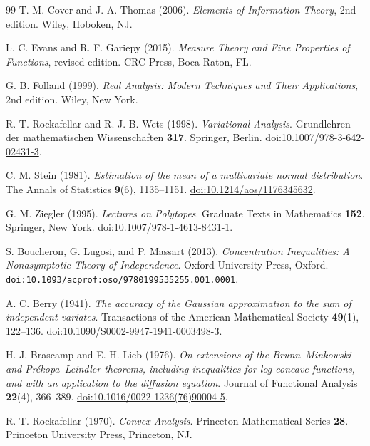 \documentclass[11pt,letterpaper]{article}
\theoremstyle{remark}
\begin{document}
\begin{thebibliography}{99}
T. M. Cover and J. A. Thomas (2006).
\emph{Elements of Information Theory}, 2nd edition.
Wiley, Hoboken, NJ.

L. C. Evans and R. F. Gariepy (2015).
\emph{Measure Theory and Fine Properties of Functions}, revised edition.
CRC Press, Boca Raton, FL.

G. B. Folland (1999).
\emph{Real Analysis: Modern Techniques and Their Applications}, 2nd edition.
Wiley, New York.

R. T. Rockafellar and R. J.-B. Wets (1998).
\emph{Variational Analysis}.
Grundlehren der mathematischen Wissenschaften \textbf{317}.
Springer, Berlin.
\href{https://doi.org/10.1007/978-3-642-02431-3}{doi:10.1007/978-3-642-02431-3}.

C. M. Stein (1981).
\emph{Estimation of the mean of a multivariate normal distribution}.
The Annals of Statistics \textbf{9}(6), 1135--1151.
\href{https://doi.org/10.1214/aos/1176345632}{doi:10.1214/aos/1176345632}.

G. M. Ziegler (1995).
\emph{Lectures on Polytopes}.
Graduate Texts in Mathematics \textbf{152}. Springer, New York.
\href{https://doi.org/10.1007/978-1-4613-8431-1}{doi:10.1007/978-1-4613-8431-1}.

S. Boucheron, G. Lugosi, and P. Massart (2013).
\emph{Concentration Inequalities: A Nonasymptotic Theory of Independence}.
Oxford University Press, Oxford.
\href{https://doi.org/10.1093/acprof:oso/9780199535255.001.0001}{\nolinkurl{doi:10.1093/acprof:oso/9780199535255.001.0001}}.

A. C. Berry (1941).
\emph{The accuracy of the Gaussian approximation to the sum of independent variates}.
Transactions of the American Mathematical Society \textbf{49}(1), 122--136.
\href{https://doi.org/10.1090/S0002-9947-1941-0003498-3}{doi:10.1090/S0002-9947-1941-0003498-3}.

H. J. Brascamp and E. H. Lieb (1976).
\emph{On extensions of the Brunn--Minkowski and Pr\'ekopa--Leindler
theorems, including inequalities for log concave functions, and with
an application to the diffusion equation}.
Journal of Functional Analysis \textbf{22}(4), 366--389.
\href{https://doi.org/10.1016/0022-1236(76)90004-5}{doi:10.1016/0022-1236(76)90004-5}.

R. T. Rockafellar (1970).
\emph{Convex Analysis}.
Princeton Mathematical Series \textbf{28}.
Princeton University Press, Princeton, NJ.


\end{thebibliography}
\end{document}
